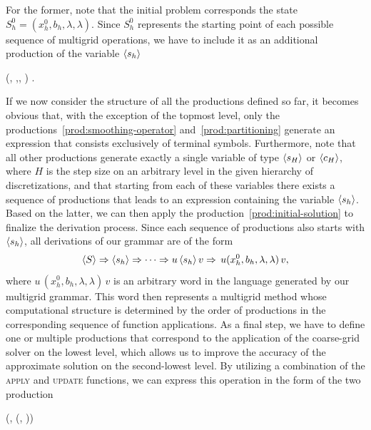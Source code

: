 For the former, note that the initial problem corresponds the state $S_h^0 = (x_h^0, b_h, \lambda, \lambda)$.
Since $S_h^0$ represents the starting point of each possible sequence of multigrid operations, we have to include it as an additional production of the variable $\langle s_h \rangle$
\begin{bnf}
	 {
	 (, \bnfsp {},\bnfsp \bnfes, \bnfsp \bnfes)
	}.
\label{prod:initial-solution}
\end{bnf} 
If we now consider the structure of all the productions defined so far, it becomes obvious that, with the exception of the topmost level, only the productions~\eqref{prod:smoothing-operator} and~\eqref{prod:partitioning} generate an expression that consists exclusively of terminal symbols.
Furthermore, note that all other productions generate exactly a single variable of type $\langle s_H \rangle$ or $\langle c_H \rangle$, where $H$ is the step size on an arbitrary level in the given hierarchy of discretizations, and that starting from each of these variables there exists a sequence of productions that leads to an expression containing the variable $\langle s_h \rangle$.
Based on the latter, we can then apply the production~\eqref{prod:initial-solution} to finalize the derivation process.
Since each sequence of productions also starts with $\langle s_h \rangle$, all derivations of our grammar are of the form
\begin{equation*}
	\langle S \rangle \Rightarrow \langle s_h \rangle \Rightarrow \dots \Rightarrow u \, \langle s_h \rangle \, v \Rightarrow \, u (x_h^0, b_h, \lambda, \lambda) \, v,
\end{equation*}
where $u  \, (x_h^0, b_h, \lambda, \lambda) \, v$ is an arbitrary word in the language generated by our multigrid grammar.
This word then represents a multigrid method whose computational structure is determined by the order of productions in the corresponding sequence of function applications.
As a final step, we have to define one or multiple productions that correspond to the application of the coarse-grid solver on the lowest level, which allows us to improve the accuracy of the approximate solution on the second-lowest level.
By utilizing a combination of the \textsc{apply} and \textsc{update} functions, we can express this operation in the form of the two production
\begin{bnf}
	 {
		(, \bnfsp {}(, \bnfsp{}))
	} 	\label{prod:coarse-grid-solver} \\
	 	\label{prod:coarse-grid-solver-correction}
\end{bnf}
